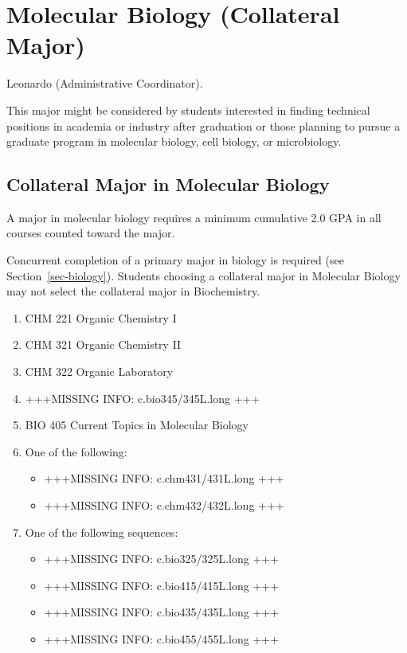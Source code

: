 \documentclass[
  letterpaper,
]{scrbook}
\providecommand{\tightlist}{%
  \setlength{\itemsep}{0pt}\setlength{\parskip}{0pt}}
\begin{document}
\section{Molecular Biology (Collateral
Major)}\label{sec-molecular-biology}

Leonardo (Administrative Coordinator).

This major might be considered by students interested in finding
technical positions in academia or industry after graduation or those
planning to pursue a graduate program in molecular biology, cell
biology, or microbiology.

\subsection{Collateral Major in Molecular
Biology}\label{collateral-major-in-molecular-biology}

A major in molecular biology requires a minimum cumulative 2.0 GPA in
all courses counted toward the major.

Concurrent completion of a primary major in biology is required (see
Section~\ref{sec-biology}). Students choosing a collateral major in
Molecular Biology may not select the collateral major in Biochemistry.

\begin{enumerate}
\def\labelenumi{\arabic{enumi}.}
\tightlist
\item
  CHM 221 Organic Chemistry I
\item
  CHM 321 Organic Chemistry II
\item
  CHM 322 Organic Laboratory
\item
  +++MISSING INFO: c.bio345/345L.long +++
\item
  BIO 405 Current Topics in Molecular Biology
\item
  One of the following:

  \begin{itemize}
  \tightlist
  \item
    +++MISSING INFO: c.chm431/431L.long +++
  \item
    +++MISSING INFO: c.chm432/432L.long +++
  \end{itemize}
\item
  One of the following sequences:

  \begin{itemize}
  \tightlist
  \item
    +++MISSING INFO: c.bio325/325L.long +++
  \item
    +++MISSING INFO: c.bio415/415L.long +++
  \item
    +++MISSING INFO: c.bio435/435L.long +++
  \item
    +++MISSING INFO: c.bio455/455L.long +++
  \end{itemize}
\end{enumerate}
\end{document}
